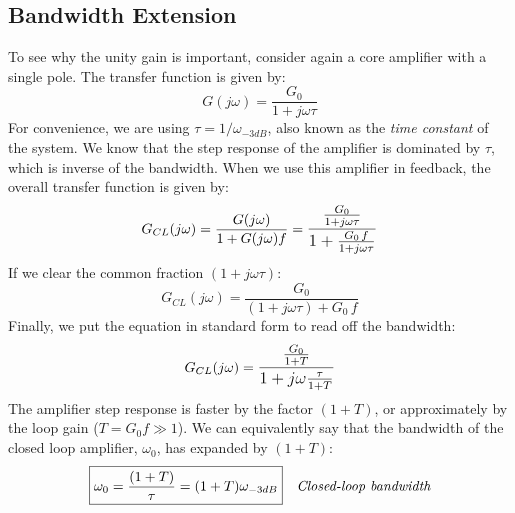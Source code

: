 \subsection{Bandwidth Extension}
To see why the unity gain is important, consider again a core amplifier with a single pole.  The transfer function is given by:
    \begin{equation}
        G(j\omega) = \frac{G_0}{1 + j\omega\tau}
    \end{equation}
For convenience, we are using $\tau = 1/\omega_{-3dB}$, also known as the \textit{time constant} of the system.  We know that the step response of the amplifier is dominated by $\tau$, which is inverse of the bandwidth.  When we use this amplifier in feedback, the overall transfer function is given by:
    \begin{equation}
        G_{CL}(j\omega ) = \frac{G(j\omega)}{1 + G(j\omega)f}
        = \mathlarger{\frac{\frac{G_0}{1 + j\omega\tau}}
                        {1 + \frac{G_0\,f}{1 + j\omega\tau}}}
    \end{equation}
If we clear the common fraction $(1 + j\omega \tau)$:
    \begin{equation}
        G_{CL}(j\omega) = \frac{G_0}{(1 + j\omega\tau) + G_0\,f}
    \end{equation}
Finally, we put the equation in standard form to read off the bandwidth:
    \begin{equation}
        G_{CL}(j\omega) = \mathlarger{\frac{\frac{G_0}{1 + T}}{1 + j\omega \frac{\tau}{1+T}}}
    \end{equation}
The amplifier step response is faster by the factor $(1 + T)$, or approximately by the loop gain ($T = G_0 f \gg 1$).  We can equivalently say that the bandwidth of the closed loop amplifier,  $\omega_0$,  has expanded by $(1+T)$:
    \begin{align}
        \Aboxed{\omega_0 &= \frac{(1+T)}{\tau} = (1 + T)\omega_{-3dB}}
        &\textit{Closed-loop bandwidth}
        \label{eq:cl_bandwidth}
    \end{align}
